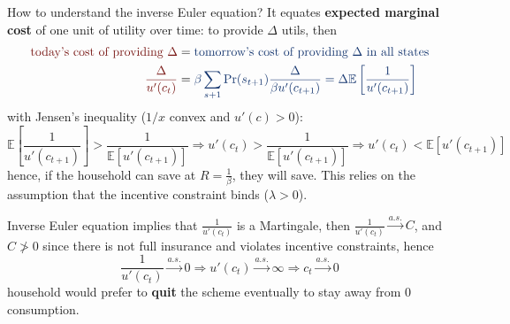 \documentclass[10pt,landscape,a4paper]{article}
\begin{document}
\begin{multicols*}{3}
How to understand the inverse Euler equation? It equates \textbf{expected marginal cost} of one unit of utility over time: to provide $\Delta$ utils, then
\begin{align*}
    {\color{myred}\text{today's cost of providing }\Delta} &= {\color{myblue}\text{tomorrow's cost of providing }\Delta\text{ in all states}}\\
    {\color{myred}\frac{\Delta}{u'(c_t)}} &= {\color{myblue}\beta \sum_{s+1}\Pr(s_{t+1})\frac{\Delta}{\beta u'(c_{t+1})}=\Delta\mathbb{E}\left[\frac{1}{u'(c_{t+1})}\right]}
\end{align*}
with Jensen's inequality ($1/x$ convex and $u'(c)>0$):
$$
\mathbb{E}\left[\frac{1}{u'(c_{t+1})}\right] > \frac{1}{\mathbb{E}\left[u'(c_{t+1})\right]} \Rightarrow u'(c_t) > \frac{1}{\mathbb{E}\left[u'(c_{t+1})\right]} \Rightarrow u'(c_t) < \mathbb{E}\left[u'(c_{t+1})\right]
$$
hence, if the household can save at $R=\frac{1}{\beta}$, they will save. This relies on the assumption that the incentive constraint binds ({\color{myred}$\lambda >0$}).

Inverse Euler equation implies that $\frac{1}{u'(c_t)}$ is a Martingale, then $\frac{1}{u'(c_t)}\xrightarrow{a.s.} C$, and $C\not>0$ since there is not full insurance and violates incentive constraints, hence 
$$
\frac{1}{u'(c_t)}\xrightarrow{a.s.} 0 \Rightarrow u'(c_t)\xrightarrow{a.s.}\infty \Rightarrow c_t\xrightarrow{a.s.} 0
$$
household would prefer to \textbf{quit} the scheme eventually to stay away from 0 consumption.


\end{multicols*}
\end{document}
